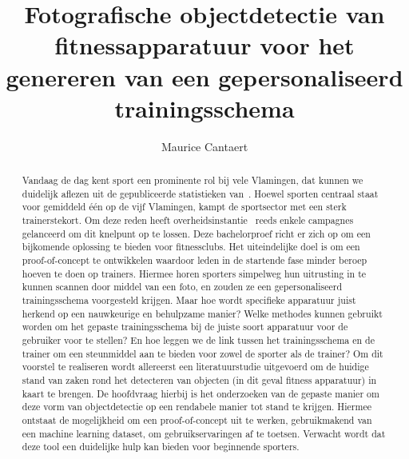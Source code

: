 \documentclass{hogent-article}
\title{Fotografische objectdetectie van fitnessapparatuur voor het genereren van een gepersonaliseerd trainingsschema}
\author{Maurice Cantaert}
\begin{document}
    \begin{abstract}
        Vandaag de dag kent sport een prominente rol bij vele Vlamingen, dat kunnen we duidelijk aflezen uit de gepubliceerde statistieken van~\textcite{StatistiekVlaanderen2023}.
        Hoewel sporten centraal staat voor gemiddeld \'e\'en op de vijf Vlamingen, kampt de sportsector met een sterk trainerstekort.
        Om deze reden heeft overheidsinstantie~\textcite{SportVlaanderen2023} reeds enkele campagnes gelanceerd om dit knelpunt op te lossen.
        Deze bachelorproef richt er zich op om een bijkomende oplossing te bieden voor fitnessclubs.
        Het uiteindelijke doel is om een proof-of-concept te ontwikkelen waardoor leden in de startende fase minder beroep hoeven te doen op trainers.
        Hiermee horen sporters simpelweg hun uitrusting in te kunnen scannen door middel van een foto, en zouden ze een gepersonaliseerd trainingsschema voorgesteld krijgen.
        Maar hoe wordt specifieke apparatuur juist herkend op een nauwkeurige en behulpzame manier?
        Welke methodes kunnen gebruikt worden om het gepaste trainingsschema bij de juiste soort apparatuur voor de gebruiker voor te stellen?
        En hoe leggen we de link tussen het trainingsschema en de trainer om een steunmiddel aan te bieden voor zowel de sporter als de trainer?
        Om dit voorstel te realiseren wordt allereerst een literatuurstudie uitgevoerd om de huidige stand van zaken rond het detecteren van objecten (in dit geval fitness apparatuur) in kaart te brengen.
        De hoofdvraag hierbij is het onderzoeken van de gepaste manier om deze vorm van objectdetectie op een rendabele manier tot stand te krijgen.
        Hiermee ontstaat de mogelijkheid om een proof-of-concept uit te werken, gebruikmakend van een machine learning dataset, om gebruikservaringen af te toetsen.
        Verwacht wordt dat deze tool een duidelijke hulp kan bieden voor beginnende sporters.
    \end{abstract}

    \tableofcontents

    

    \printbibliography[heading=bibintoc]
\end{document}
